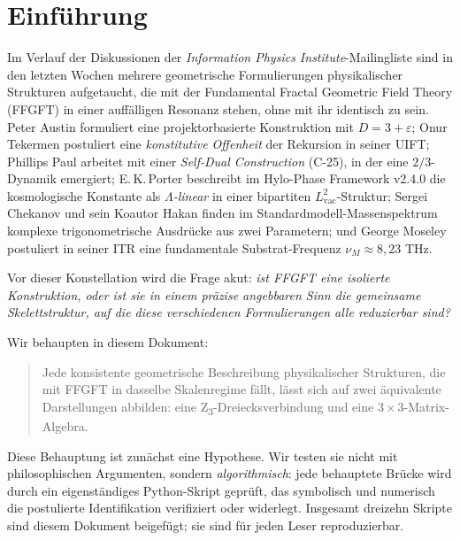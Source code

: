 
\section{Einführung}
\label{sec:einfuehrung}

Im Verlauf der Diskussionen der \emph{Information Physics Institute}-Mailingliste sind in den letzten Wochen mehrere geometrische Formulierungen physikalischer Strukturen aufgetaucht, die mit der Fundamental Fractal Geometric Field Theory (FFGFT) in einer auffälligen Resonanz stehen, ohne mit ihr identisch zu sein. Peter Austin formuliert eine projektorbasierte Konstruktion mit \(D = 3 + \varepsilon\); Onur Tekermen postuliert eine \emph{konstitutive Offenheit} der Rekursion in seiner UIFT; Phillips Paul arbeitet mit einer \emph{Self-Dual Construction} (C-25), in der eine \(2/3\)-Dynamik emergiert; E.\,K.\,Porter beschreibt im Hylo-Phase Framework v2.4.0 die kosmologische Konstante als \emph{\(\Lambda\)-linear} in einer bipartiten \(L_\text{vac}^2\)-Struktur; Sergei Chekanov und sein Koautor Hakan finden im Standardmodell-Massenspektrum komplexe trigonometrische Ausdrücke aus zwei Parametern; und George Moseley postuliert in seiner ITR eine fundamentale Substrat-Frequenz \(\nu_M \approx 8{,}23\) THz.

Vor dieser Konstellation wird die Frage akut: \emph{ist FFGFT eine isolierte Konstruktion, oder ist sie in einem präzise angebbaren Sinn die gemeinsame Skelettstruktur, auf die diese verschiedenen Formulierungen alle reduzierbar sind?}

Wir behaupten in diesem Dokument:
\begin{quote}
Jede konsistente geometrische Beschreibung physikalischer Strukturen, die mit FFGFT in dasselbe Skalenregime fällt, lässt sich auf zwei äquivalente Darstellungen abbilden: eine Z\textsubscript{3}-Dreiecksverbindung und eine 3\,$\times$\,3-Matrix-Algebra.
\end{quote}

Diese Behauptung ist zunächst eine Hypothese. Wir testen sie nicht mit philosophischen Argumenten, sondern \emph{algorithmisch}: jede behauptete Brücke wird durch ein eigenständiges Python-Skript geprüft, das symbolisch und numerisch die postulierte Identifikation verifiziert oder widerlegt. Insgesamt dreizehn Skripte sind diesem Dokument beigefügt; sie sind für jeden Leser reproduzierbar.

